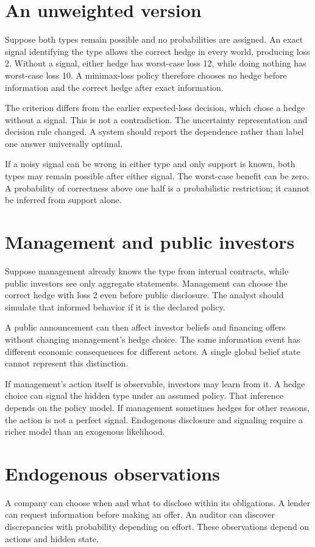 \section{An unweighted version}
Suppose both types remain possible and no probabilities are assigned. An exact signal identifying the type allows the correct hedge in every world, producing loss 2. Without a signal, either hedge has worst-case loss 12, while doing nothing has worst-case loss 10. A minimax-loss policy therefore chooses no hedge before information and the correct hedge after exact information.

The criterion differs from the earlier expected-loss decision, which chose a hedge without a signal. This is not a contradiction. The uncertainty representation and decision rule changed. A system should report the dependence rather than label one answer universally optimal.

If a noisy signal can be wrong in either type and only support is known, both types may remain possible after either signal. The worst-case benefit can be zero. A probability of correctness above one half is a probabilistic restriction; it cannot be inferred from support alone.

\section{Management and public investors}
Suppose management already knows the type from internal contracts, while public investors see only aggregate statements. Management can choose the correct hedge with loss 2 even before public disclosure. The analyst should simulate that informed behavior if it is the declared policy.

A public announcement can then affect investor beliefs and financing offers without changing management's hedge choice. The same information event has different economic consequences for different actors. A single global belief state cannot represent this distinction.

If management's action itself is observable, investors may learn from it. A hedge choice can signal the hidden type under an assumed policy. That inference depends on the policy model. If management sometimes hedges for other reasons, the action is not a perfect signal. Endogenous disclosure and signaling require a richer model than an exogenous likelihood.

\section{Endogenous observations}
A company can choose when and what to disclose within its obligations. A lender can request information before making an offer. An auditor can discover discrepancies with probability depending on effort. These observations depend on actions and hidden state.

